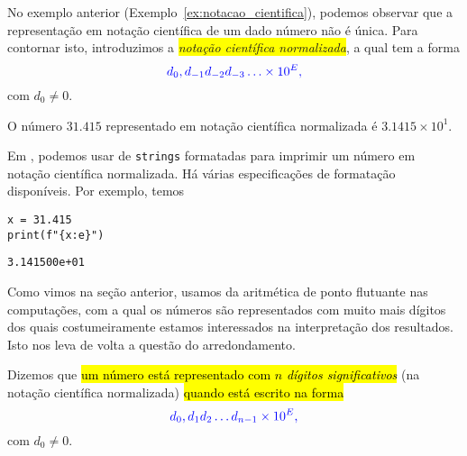 No exemplo anterior (Exemplo~\ref{ex:notacao_cientifica}), podemos observar que a representação em notação científica de um dado número não é única. Para contornar isto, introduzimos a \colorbox{yellow}{\emph{notação científica normalizada}}, a qual tem a forma
\begin{equation}
  \color{blue}d_0,d_{-1}d_{-2}d_{-3}\ldots\times 10^{E},
\end{equation}
com $d_0 \neq 0$.

\begin{ex}
  O número $31.415$ representado em notação científica normalizada é $3.1415\times 10^{1}$.

  Em {\python}, podemos usar de \texttt{strings} formatadas para imprimir um número em notação científica normalizada. Há várias especificações de formatação disponíveis. Por exemplo, temos

\begin{lstlisting}
x = 31.415
print(f"{x:e}")
\end{lstlisting}

\begin{verbatim}
3.141500e+01
\end{verbatim}

\end{ex}

Como vimos na seção anterior, usamos da aritmética de ponto flutuante nas computações, com a qual os números são representados com muito mais dígitos dos quais costumeiramente estamos interessados na interpretação dos resultados. Isto nos leva de volta a questão do arredondamento.

Dizemos que \hl{um número está representado com $n$ \emph{dígitos significativos}} (na notação científica normalizada) \hl{quando está escrito na forma}
\begin{equation}
  \color{blue}d_0,d_{1}d_{2}\ldots d_{n-1}\times 10^{E},
\end{equation}
com $d_0\neq 0$.

